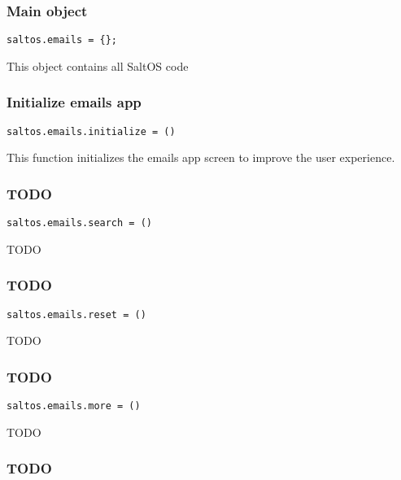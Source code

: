 \documentclass[a4paper]{article}
\begin{document}
\hypertarget{toc17}{}
\subsubsection{Main object}

\begin{lstlisting}
saltos.emails = {};
\end{lstlisting}

This object contains all SaltOS code

\hypertarget{toc18}{}
\subsubsection{Initialize emails app}

\begin{lstlisting}
saltos.emails.initialize = ()
\end{lstlisting}

This function initializes the emails app screen to improve the user experience.

\hypertarget{toc19}{}
\subsubsection{TODO}

\begin{lstlisting}
saltos.emails.search = ()
\end{lstlisting}

TODO

\hypertarget{toc20}{}
\subsubsection{TODO}

\begin{lstlisting}
saltos.emails.reset = ()
\end{lstlisting}

TODO

\hypertarget{toc21}{}
\subsubsection{TODO}

\begin{lstlisting}
saltos.emails.more = ()
\end{lstlisting}

TODO

\hypertarget{toc22}{}
\subsubsection{TODO}
\end{document}
